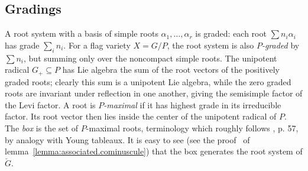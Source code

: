 \documentclass[a4paper,10pt]{amsart}
\theoremstyle{remark}
\begin{document}
\subsection{Gradings}
A root system with a basis of simple roots \(\alpha_1,\dots,\alpha_r\) is graded: each root \(\sum n_i \alpha_i\) has grade \(\sum_i n_i\).
For a flag variety \(X=G/P\), the root system is also \emph{\(P\)-graded} by \(\sum n_i\), but summing only over the noncompact simple roots.
The unipotent radical \(G_+\subseteq P\) has Lie algebra the sum of the root vectors of the positively graded roots; clearly this sum is a unipotent Lie algebra, while the zero graded roots are invariant under reflection in one another, giving the semisimple factor of the Levi factor.
A root is \emph{\(P\)-maximal} if it has highest grade in its irreducible factor.
Its root vector then lies inside the center of the unipotent radical of \(P\).
The \emph{box} is the set of \(P\)-maximal roots, terminology which roughly follows \cite{Buch.Chaput.Mihalcea.Perrin:2018}, \cite{Lam.Williams:2008} p. 57, by analogy with Young tableaux.
It is easy to see (see the proof~ of lemma~\ref{lemma:associated.cominuscule}) that the box generates the root system of \(\breve{G}\).
\end{document}
